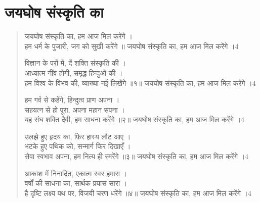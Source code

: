 \section{जयघोष संस्कृति का}
\label{sec:jai-ghosh-sanskriti-ka}

\begin{verse}

जयघोष संस्कृति का, हम आज मिल करेंगे ।\\
हम धर्म के पुजारी, जग को सुखी करेंगे ॥
जयघोष संस्कृति का, हम आज मिल करेंगे ।4

विज्ञान के परों में, दें शक्ति संस्कृति की ।\\
आध्यात्म नींव होगी, समृद्ध हिन्दुओं की ।\\
हम विश्व के विभव की, व्याख्या नई लिखेंगे ॥१॥
जयघोष संस्कृति का, हम आज मिल करेंगे ।4

हम गर्व से कहेंगे, हिन्दुत्व प्राण अपना ।\\
सहयत्न से हो पूरा, अपना महान सपना ।\\
यह संघ शक्ति दैवी, हम साधना करेंगे ॥२॥
जयघोष संस्कृति का, हम आज मिल करेंगे ।4

उलझे हुए हृदय का, फिर हास्य लौट आए ।\\
भटके हुए पथिक को, सन्मार्ग फिर दिखाएँ ।\\
सेवा स्वभाव अपना, हम नित्य ही स्मरेंगे ॥३॥
जयघोष संस्कृति का, हम आज मिल करेंगे ।4

आकाश में निनादित, एकात्म स्वर हमारा ।\\
वर्षों की साधना का, सार्थक प्रयास सारा ।\\
है दृष्टि लक्ष्य पथ पर, विजयी चरण धरेंगे ॥४॥
जयघोष संस्कृति का, हम आज मिल करेंगे ।4

\end{verse}
